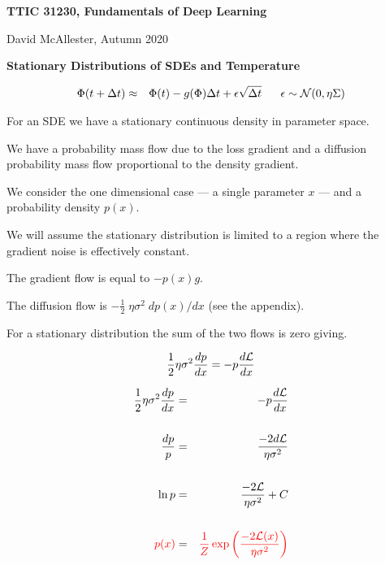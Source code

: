 




{\Huge
  \centerline{\bf TTIC 31230, Fundamentals of Deep Learning}
  \bigskip
  \centerline{David McAllester, Autumn 2020}
  \vfill
  \centerline{\bf Stationary Distributions of SDEs and Temperature}
  \vfill
  \vfill
  \vfill


\begin{eqnarray*}
\Phi(t + \Delta t) & \approx & \Phi(t) -g(\Phi)\Delta t + \epsilon \sqrt{\Delta t}\;\;\;\;\;\; \epsilon \sim {\cal N}(0,\eta\Sigma)
\end{eqnarray*}

\vfill
For an SDE we have a stationary continuous density in parameter space.

\vfill
We have a probability mass flow due to the loss gradient and a diffusion probability mass flow proportional to the density gradient.



We consider the one dimensional case --- a single parameter $x$ --- and a probability density $p(x)$.

\vfill
We will assume the stationary distribution is limited to a region where the gradient noise is effectively constant.

\vfill
The gradient flow is equal to $- p(x)g$.

\vfill
The diffusion flow is  $- \frac{1}{2} \;\eta\sigma^2\;dp(x)/dx$ (see the appendix).


\vfill
For a stationary distribution the sum of the two flows is zero giving.

\vfill
{\color{red} $$\frac{1}{2} \eta \sigma^2 \frac{dp}{dx} = - p\frac{d{\cal L}}{dx}$$}



\vspace{-2ex}
\begin{eqnarray*}
\frac{1}{2} \eta \sigma^2 \frac{dp}{dx} & = & - p\frac{d{\cal L}}{dx} \\
\\
\frac{dp}{p} & = & \frac{-2d{\cal L}}{\eta\sigma^2} \\
\\
\ln p & = & \frac{-2{\cal L}}{\eta \sigma^2} + C \\
\\
{\color{red} p(x)} & = & {\color{red} \frac{1}{Z}\exp\left(\frac{-2{\cal L}(x)}{\eta \sigma^2}\right)}
\end{eqnarray*}

}
